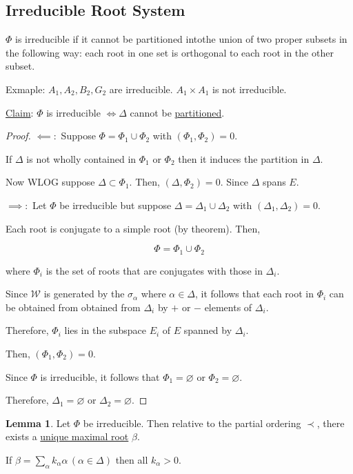 \documentclass{article}
\theoremstyle{definition}
\newtheorem{lemma}[theorem]{Lemma}
\begin{document}
\subsection*{Irreducible Root System}

\(\Phi\) is irreducible if it cannot be partitioned intothe union of two proper subsets in the following way: each root in one set is orthogonal to each root in the other subset.

Exmaple: \(A_1, A_2, B_2, G_2\) are irreducible. \(A_1 \times A_1\) is not irreducible.

\underline{Claim}: \(\Phi\) is irreducible \(\iff \Delta\) cannot be \underline{partitioned}.

\begin{proof}
    \(\impliedby:\) Suppose \(\Phi = \Phi_1 \cup \Phi_2\) with \((\Phi_1, \Phi_2) = 0\).

    If \(\Delta\) is not wholly contained in \(\Phi_1\) or \(\Phi_2\) then it induces the partition in \(\Delta\). 

    Now WLOG suppose \(\Delta \subset \Phi_1\). Then, \((\Delta , \Phi_2) = 0\). Since \(\Delta\) spans \(E\).

    \(\implies:\) Let \(\Phi\) be irreducible but suppose \(\Delta = \Delta_1 \cup \Delta_2\) with \((\Delta_1, \Delta_2) = 0\).

    Each root is conjugate to a simple root (by theorem). Then,

    \[
        \Phi = \Phi_1 \cup \Phi_2
    \]

    where \(\Phi_i\) is the set of roots that are conjugates with those in \(\Delta_i\).

    Since \(\mathcal{W}\) is generated by the \(\sigma_\alpha\) where \(\alpha \in \Delta\), it follows that each root in \(\Phi_i\) can be obtained from obtained from \(\Delta_i\) by \(+\) or \(-\) elements of \(\Delta_i\).

    Therefore, \(\Phi_i\) lies in the subspace \(E_i\) of \(E\) spanned by \(\Delta_i\).

    Then, \((\Phi_1, \Phi_2) = 0\).
    
    Since \(\Phi\) is irreducible, it follows that \(\Phi_1 = \varnothing \) or \(\Phi_2 = \varnothing \).

    Therefore, \(\Delta_1 = \varnothing\) or \(\Delta_2 = \varnothing\).

\end{proof}

\begin{lemma}
    Let \(\Phi\) be irreducible. Then relative to the partial ordering \(\prec\), there exists a \underline{unique maximal root} \(\beta\).

    If \(\beta = \sum_{\alpha} k_\alpha \alpha \,(\alpha \in \Delta)\) then all \(k_\alpha > 0\).
\end{lemma}
\end{document}
